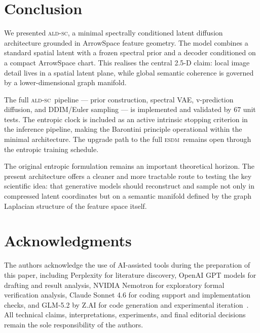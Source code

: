 \documentclass[11pt]{article}
\newcommand{\ESDM}{\textsc{esdm}}
\newcommand{\ALDSC}{\textsc{ald-sc}}
\begin{document}
    \section{Conclusion}
    \label{sec:conclusion}
    We presented \ALDSC, a minimal spectrally conditioned latent
    diffusion architecture grounded in ArrowSpace feature geometry.
    The model combines a standard spatial latent with a frozen
    spectral prior and a decoder conditioned on a compact ArrowSpace
    chart. This realises the central 2.5-D claim: local image detail
    lives in a spatial latent plane, while global semantic coherence
    is governed by a lower-dimensional graph manifold.

    The full \ALDSC~pipeline --- prior construction, spectral VAE,
    v-prediction diffusion, and DDIM/Euler sampling --- is implemented
    and validated by 67 unit tests. The entropic clock is included as
    an active intrinsic stopping criterion in the inference pipeline,
    making the Barontini principle operational within the minimal
    architecture. The upgrade path to the full \ESDM~remains open
    through the entropic training schedule.

    The original entropic formulation remains an important theoretical
    horizon. The present architecture offers a cleaner and more
    tractable route to testing the key scientific idea: that generative
    models should reconstruct and sample not only in compressed latent
    coordinates but on a semantic manifold defined by the graph
    Laplacian structure of the feature space itself.

    \section*{Acknowledgments}
    The authors acknowledge the use of AI-assisted tools during the
    preparation of this paper, including Perplexity for literature
    discovery, OpenAI GPT models for drafting and result analysis,
    NVIDIA Nemotron for exploratory formal verification analysis,
    Claude Sonnet 4.6 for coding support and implementation checks,
    and GLM-5.2 by Z.AI for code generation and experimental
    iteration~\cite{perplexity,openai_gpt5,nvidia_nemotron,anthropic_claude46,zai_glm52}.
    All technical claims, interpretations, experiments, and final
    editorial decisions remain the sole responsibility of the authors.
\end{document}
